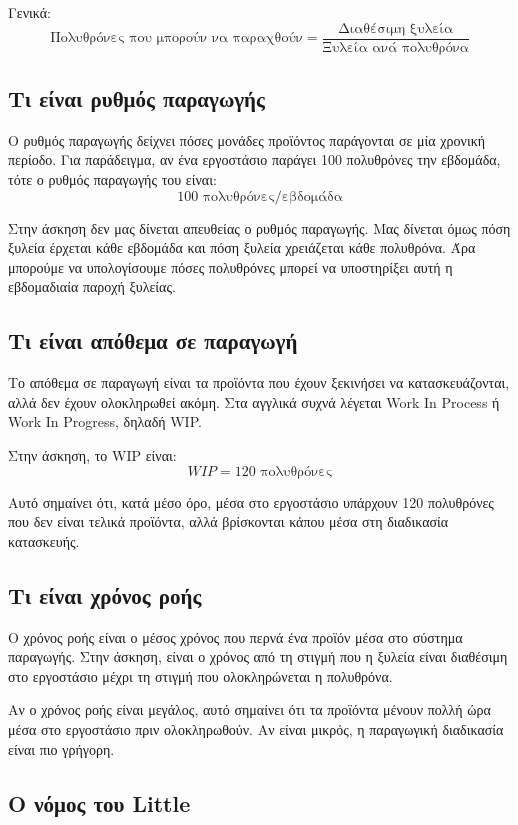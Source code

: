 \documentclass[12pt,a4paper]{article}
\begin{document}
Γενικά:
\[
\text{Πολυθρόνες που μπορούν να παραχθούν}=
\frac{\text{Διαθέσιμη ξυλεία}}{\text{Ξυλεία ανά πολυθρόνα}}
\]

\subsection{Τι είναι ρυθμός παραγωγής}

Ο ρυθμός παραγωγής δείχνει πόσες μονάδες προϊόντος παράγονται σε μία χρονική περίοδο. Για παράδειγμα, αν ένα εργοστάσιο παράγει 100 πολυθρόνες την εβδομάδα, τότε ο ρυθμός παραγωγής του είναι:
\[
100 \text{ πολυθρόνες/εβδομάδα}
\]

Στην άσκηση δεν μας δίνεται απευθείας ο ρυθμός παραγωγής. Μας δίνεται όμως πόση ξυλεία έρχεται κάθε εβδομάδα και πόση ξυλεία χρειάζεται κάθε πολυθρόνα. Άρα μπορούμε να υπολογίσουμε πόσες πολυθρόνες μπορεί να υποστηρίξει αυτή η εβδομαδιαία παροχή ξυλείας.

\subsection{Τι είναι απόθεμα σε παραγωγή}

Το απόθεμα σε παραγωγή είναι τα προϊόντα που έχουν ξεκινήσει να κατασκευάζονται, αλλά δεν έχουν ολοκληρωθεί ακόμη. Στα αγγλικά συχνά λέγεται \textenglish{Work In Process} ή \textenglish{Work In Progress}, δηλαδή WIP.

Στην άσκηση, το WIP είναι:
\[
WIP=120 \text{ πολυθρόνες}
\]

Αυτό σημαίνει ότι, κατά μέσο όρο, μέσα στο εργοστάσιο υπάρχουν 120 πολυθρόνες που δεν είναι τελικά προϊόντα, αλλά βρίσκονται κάπου μέσα στη διαδικασία κατασκευής.

\subsection{Τι είναι χρόνος ροής}

Ο χρόνος ροής είναι ο μέσος χρόνος που περνά ένα προϊόν μέσα στο σύστημα παραγωγής. Στην άσκηση, είναι ο χρόνος από τη στιγμή που η ξυλεία είναι διαθέσιμη στο εργοστάσιο μέχρι τη στιγμή που ολοκληρώνεται η πολυθρόνα.

Αν ο χρόνος ροής είναι μεγάλος, αυτό σημαίνει ότι τα προϊόντα μένουν πολλή ώρα μέσα στο εργοστάσιο πριν ολοκληρωθούν. Αν είναι μικρός, η παραγωγική διαδικασία είναι πιο γρήγορη.

\subsection{Ο νόμος του Little}
\end{document}
